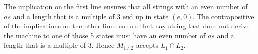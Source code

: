 \documentclass[12pt]{article}
\begin{document}
\begin{enumerate}[1.]
    \bigskip

    The implication on the first line ensures that all strings with an even number
    of $as$ and a length that is a multiple of 3 end up in state $(e,0)$. The
    contrapositive of the implications on the other lines ensure that nay string that does
    not derive the machine to one of those 5 states must have an even number of $as$
    and a length that is a multiple of 3. Hence $M_{1 \land 2}$ accepts
    $L_1 \cap L_2$.
    \end{enumerate}
\end{document}
